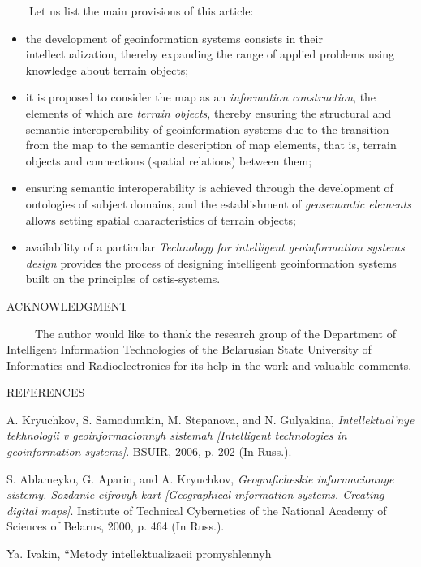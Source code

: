 \documentclass{article}
\begin{document}
\begin{multicols}{2}
\ \ \ \ Let us list the main provisions of this article:
\begin{itemize}
  \item  the development of geoinformation systems consists
in their intellectualization, thereby expanding the
range of applied problems using knowledge about
terrain objects;
  \item it is proposed to consider the map as an \textit{information
construction}, the elements of which are \textit{terrain
objects}, thereby ensuring the structural and semantic
interoperability of geoinformation systems due to the
transition from the map to the semantic description of
map elements, that is, terrain objects and connections
(spatial relations) between them;
  \item  ensuring semantic interoperability is achieved
through the development of ontologies of subject
domains, and the establishment of  \textit{geosemantic
elements} allows setting spatial characteristics of
terrain objects;
  \item availability of a particular  \textit{Technology for intelligent
geoinformation systems design} provides the process
of designing intelligent geoinformation systems built
on the principles of ostis-systems.
 \end{itemize}
\begin{center}
 ACKNOWLEDGMENT
 \end{center}
\ \ \ \  \ The author would like to thank the research group of
the Department of Intelligent Information Technologies
of the Belarusian State University of Informatics and
Radioelectronics for its help in the work and valuable
comments.
\begin{center}
 REFERENCES
 \end{center}
\begin{itemize}
 \footnotesize{
  \renewcommand{\labelitemi}{[1]}
		\item A. Kryuchkov, S. Samodumkin, M. Stepanova, and N. Gulyakina,
 \textit{Intellektual’nye tekhnologii v geoinformacionnyh sistemah [Intelligent technologies in geoinformation systems]}. BSUIR, 2006, p.
202 (In Russ.).
\renewcommand{\labelitemi}{[2]}
		\item S. Ablameyko, G. Aparin, and A. Kryuchkov,  \textit{Geograficheskie
informacionnye sistemy. Sozdanie cifrovyh kart [Geographical
information systems. Creating digital maps]}. Institute of Technical
Cybernetics of the National Academy of Sciences of Belarus, 2000,
p. 464 (In Russ.).
\renewcommand{\labelitemi}{[3]}	
\item  Ya. Ivakin, “Metody intellektualizacii promyshlennyh
}
\end{itemize}
\end{multicols}
\end{document}
